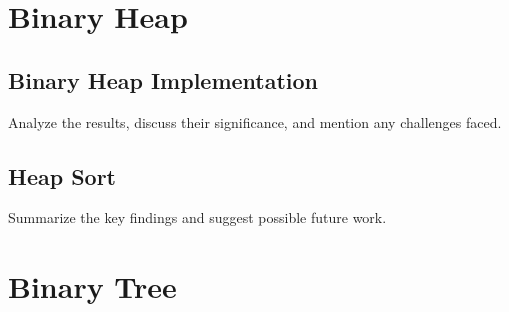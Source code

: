 \documentclass[a4paper,12pt,twocolumn]{article}
\begin{document}
\section{Binary Heap}
\label{sec:binary-heap}
\subsection{Binary Heap Implementation}
Analyze the results, discuss their significance, and mention any challenges faced.

\subsection{Heap Sort}
Summarize the key findings and suggest possible future work.


\section{Binary Tree}
\label{sec:binary-tree}

\printbibliography
\end{document}
